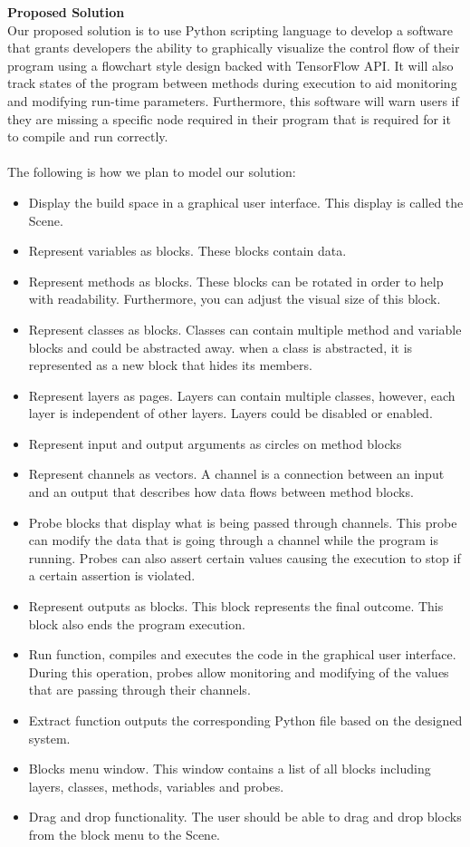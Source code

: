 \documentclass[a4paper,10pt]{IEEEtran} \usepackage[margin=1.0in]{geometry} \usepackage{pdfpages} \usepackage{graphicx}
\begin{document}
	\noindent \textbf{Proposed Solution}\\
	\indent Our proposed solution is to use Python scripting language to develop a software that grants developers the ability to graphically visualize the control flow of their program using a flowchart style design backed with TensorFlow API.
	 It will also track states of the program between methods during execution to aid monitoring and modifying run-time parameters.
	 Furthermore, this software will warn users if they are missing a specific node required in their program that is required for it to compile and run correctly.\\
	 \\The following is how we plan to model our solution:
	\begin{itemize}
		\item Display the build space in a graphical user interface. This display is called the Scene.
		\item Represent variables as blocks. These blocks contain data.
		\item Represent methods as blocks. These blocks can be rotated in order to help with readability. Furthermore, you can adjust the visual size of this block.
		\item Represent classes as blocks. Classes can contain multiple method and variable blocks and could be abstracted away.
		 when a class is abstracted, it is represented as a new block that hides its members.
		\item Represent layers as pages. Layers can contain multiple classes, however, each layer is independent of other layers. Layers could be disabled or enabled.
		\item Represent input and output arguments as circles on method blocks
		\item Represent channels as vectors. A channel is a connection between an input and an output that describes how data flows between method blocks.
		\item Probe blocks that display what is being passed through channels.
		 This probe can modify the data that is going through a channel while the program is running.
		 Probes can also assert certain values causing the execution to stop if a certain assertion is violated.
		\item Represent outputs as blocks. This block represents the final outcome.
		 This block also ends the program execution.
		\item Run function, compiles and executes the code in the graphical user interface.
		 During this operation, probes allow monitoring and modifying of the values that are passing through their channels.
		\item Extract function outputs the corresponding Python file based on the designed system.
		\item Blocks menu window. This window contains a list of all blocks including layers, classes, methods, variables and probes.
		\item Drag and drop functionality. The user should be able to drag and drop blocks from the block menu to the Scene.
	\end{itemize}
\end{document}

